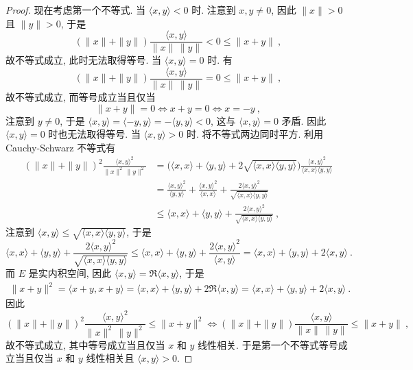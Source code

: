 \begin{proof}
    现在考虑第一个不等式. 当 \(\langle x, y \rangle < 0\) 时. 注意到 \(x, y \neq 0\), 因此 \(\|x\| > 0\) 且 \(\|y\| > 0\), 于是
    \[
        (\|x\| + \|y\|) \frac{\langle x, y \rangle}{\|x\|\, \|y\|} < 0 \leq \|x + y\|\ ,
    \]
    故不等式成立, 此时无法取得等号. 当 \(\langle x, y \rangle = 0\) 时. 有
    \[
        (\|x\| + \|y\|) \frac{\langle x, y \rangle}{\|x\|\, \|y\|} = 0 \leq \|x + y\|\ ,
    \]
    故不等式成立, 而等号成立当且仅当
    \[
        \|x + y\| = 0 \iff x + y = 0 \iff x = - y\ ,
    \]
    注意到 \(y \neq 0\), 于是 \(\langle x, y \rangle = \langle - y, y \rangle = - \langle y, y \rangle < 0\), 这与 \(\langle x, y \rangle = 0\) 矛盾. 因此 \(\langle x, y \rangle = 0\) 时也无法取得等号. 当 \(\langle x, y \rangle > 0\) 时. 将不等式两边同时平方. 利用 Cauchy-Schwarz 不等式有
    \begin{align*}
        (\|x\| + \|y\|)^2 \frac{\langle x, y \rangle^2}{\|x\|^2\, \|y\|^2} &= \bigl(\langle x, x \rangle + \langle y, y \rangle + 2 \sqrt{\langle x, x \rangle \langle y, y \rangle}\bigr) \frac{\langle x, y \rangle^2}{\langle x, x \rangle \langle y, y \rangle} \\
        &= \frac{\langle x, y \rangle^2}{\langle y, y \rangle} + \frac{\langle x, y \rangle^2}{\langle x, x \rangle} + \frac{2 \langle x, y \rangle^2}{\sqrt{\langle x, x \rangle \langle y, y \rangle}} \\
        &\leq \langle x, x \rangle + \langle y, y \rangle + \frac{2 \langle x, y \rangle^2}{\sqrt{\langle x, x \rangle \langle y, y \rangle}}\ ,
    \end{align*}
    注意到 \(\langle x, y \rangle \leq \sqrt{\langle x, x \rangle \langle y, y \rangle}\), 于是
    \[
        \langle x, x \rangle + \langle y, y \rangle + \frac{2 \langle x, y \rangle^2}{\sqrt{\langle x, x \rangle \langle y, y \rangle}} \leq \langle x, x \rangle + \langle y, y \rangle + \frac{2 \langle x, y \rangle^2}{\langle x, y \rangle} = \langle x, x \rangle + \langle y, y \rangle + 2 \langle x, y \rangle\ .
    \]
    而 \(E\) 是实内积空间, 因此 \(\langle x, y \rangle = \Re \langle x, y \rangle\), 于是
    \begin{align*}
        \|x + y\|^2 = \langle x + y, x + y \rangle = \langle x, x \rangle + \langle y, y \rangle + 2 \Re \langle x, y \rangle = \langle x, x \rangle + \langle y, y \rangle + 2 \langle x, y \rangle\ .
    \end{align*}
    因此
    \[
        (\|x\| + \|y\|)^2 \frac{\langle x, y \rangle^2}{\|x\|^2\, \|y\|^2} \leq \|x + y\|^2 \iff (\|x\| + \|y\|) \frac{\langle x, y \rangle}{\|x\|\, \|y\|} \leq \|x + y\|\ ,
    \]
    故不等式成立, 其中等号成立当且仅当 \(x\) 和 \(y\) 线性相关. 于是第一个不等式等号成立当且仅当 \(x\) 和 \(y\) 线性相关且 \(\langle x, y \rangle > 0\).


\end{proof}
